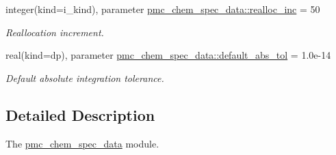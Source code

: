 \begin{DoxyCompactItemize}
\item 
integer(kind=i\+\_\+kind), parameter \mbox{\hyperlink{namespacepmc__chem__spec__data_a869f58a8ab2b2fa3818d101900a4a746}{pmc\+\_\+chem\+\_\+spec\+\_\+data\+::realloc\+\_\+inc}} = 50
\begin{DoxyCompactList}\small\item\em Reallocation increment. \end{DoxyCompactList}\item 
real(kind=dp), parameter \mbox{\hyperlink{namespacepmc__chem__spec__data_a7e43218888c66701bf61abf475882116}{pmc\+\_\+chem\+\_\+spec\+\_\+data\+::default\+\_\+abs\+\_\+tol}} = 1.\+0e-\/14
\begin{DoxyCompactList}\small\item\em Default absolute integration tolerance. \end{DoxyCompactList}\end{DoxyCompactItemize}


\subsection{Detailed Description}
The \mbox{\hyperlink{namespacepmc__chem__spec__data}{pmc\+\_\+chem\+\_\+spec\+\_\+data}} module. 

